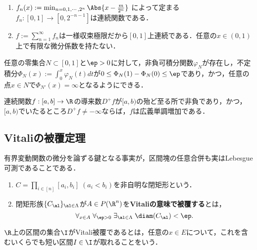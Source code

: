 \documentclass[uplatex, dvipdfmx]{jsreport}
\begin{document}
\begin{proposition}[Takagi, T. (1903)]\mbox{}
    \begin{enumerate}
        \item $f_n(x):=\min_{n=0,1,\cdots,2^n}\Abs{x-\frac{m}{2^n}}$ によって定まる$f_n:[0,1]\to[0,2^{-n-1}]$は連続関数である．
        \item $f:=\sum_{n=1}^\infty f_n$は一様収束極限だから$[0,1]$上連続である．任意の$x\in(0,1)$上で有限な微分係数を持たない．
    \end{enumerate}
\end{proposition}

\begin{theorem}
    任意の零集合$N\subset[0,1]$と$\ep>0$に対して，非負可積分関数$\varphi_N$が存在し，不定積分$\Phi_N(x):=\int^x_0\varphi_N(t)dt$が$0\le\Phi_N(1)-\Phi_N(0)\le\ep$であり，かつ，任意の点$x\in N$で$\Phi_{N'}(x)=\infty$となるようにできる．
\end{theorem}

\begin{corollary}[一般化されたDiniの定理]
    連続関数$f:[a,b]\to\R$の導来数$D^+f$が$[a,b)$の殆ど至る所で非負であり，かつ，
    $[a,b)$でいたるところ$D^+f\ne-\infty$ならば，$f$は広義単調増加である．
\end{corollary}



\subsection{Vitaliの被覆定理}

\begin{tcolorbox}[colframe=ForestGreen, colback=ForestGreen!10!white,breakable,colbacktitle=ForestGreen!40!white,coltitle=black,fonttitle=\bfseries\sffamily,
title=]
    有界変動関数の微分を論ずる鍵となる事実が，区間塊の任意合併も実はLebesgue可測であることである．
\end{tcolorbox}

\begin{definition}\mbox{}
    \begin{enumerate}
        \item $C=\prod_{i\in[n]}[a_i,b_i]\;(a_i<b_i)$を非自明な閉矩形という．
        \item 閉矩形族$\{C_\al\}_{\al\in\Lambda}$が$A\in P(\R^n)$を\textbf{Vitaliの意味で被覆する}とは，
        \[\forall_{x\in A}\;\forall_{\ep>0}\;\exists_{\al\in\Lambda}\;\diam(C_\al)<\ep.\]
    \end{enumerate}
\end{definition}
\begin{remarks}
    $\R$上の区間の集合$\I$がVitali被覆であるとは，任意の$x\in E$について，これを含むいくらでも短い区間$I\in\I$が取れることをいう．
\end{remarks}
\end{document}
